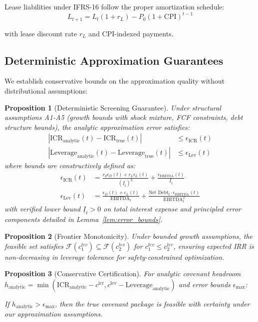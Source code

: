 \documentclass[11pt,a4paper]{article}
\newtheorem{proposition}{Proposition}
\begin{document}
Lease liabilities under IFRS-16 follow the proper amortization schedule:
\begin{equation}
L_{t+1} = L_t(1 + r_L) - P_0(1 + \text{CPI})^{t-1}
\end{equation}

with lease discount rate $r_L$ and CPI-indexed payments.

\subsection{Deterministic Approximation Guarantees}

We establish conservative bounds on the approximation quality without distributional assumptions:

\begin{proposition}[Deterministic Screening Guarantee]
Under structural assumptions A1-A5 (growth bounds with shock mixture, FCF constraints, debt structure bounds), the analytic approximation error satisfies:
\begin{align}
|\text{ICR}_{\text{analytic}}(t) - \text{ICR}_{\text{true}}(t)| &\leq \epsilon_{\text{ICR}}(t) \\
|\text{Leverage}_{\text{analytic}}(t) - \text{Leverage}_{\text{true}}(t)| &\leq \epsilon_{\text{Lev}}(t)
\end{align}
where bounds are constructively defined as:
\begin{align}
\epsilon_{\text{ICR}}(t) &= \frac{r_d \epsilon_D(t) + r_L \epsilon_L(t)}{(\underline{I}_t)^2} + \frac{\epsilon_{\text{EBITDA}}(t)}{\underline{I}_t} \\
\epsilon_{\text{Lev}}(t) &= \frac{\epsilon_D(t) + \epsilon_L(t)}{\text{EBITDA}_t} + \frac{\text{Net Debt}_t \cdot \epsilon_{\text{EBITDA}}(t)}{\text{EBITDA}_t^2}
\end{align}
with verified lower bound $\underline{I}_t > 0$ on total interest expense and principled error components detailed in Lemma~\ref{lem:error_bounds}.
\end{proposition}

\begin{proposition}[Frontier Monotonicity]
Under bounded growth assumptions, the feasible set satisfies $\mathcal{F}(c^{lev}_1) \subseteq \mathcal{F}(c^{lev}_2)$ for $c^{lev}_1 \leq c^{lev}_2$, ensuring expected IRR is non-decreasing in leverage tolerance for safety-constrained optimization.
\end{proposition}

\begin{proposition}[Conservative Certification]
For analytic covenant headroom $h_{\text{analytic}} = \min(\text{ICR}_{\text{analytic}} - c^{\text{icr}}, c^{\text{lev}} - \text{Leverage}_{\text{analytic}})$ and error bounds $\epsilon_{\max}$:

If $h_{\text{analytic}} > \epsilon_{\max}$, then the true covenant package is feasible with certainty under our approximation assumptions.
\end{proposition}
\end{document}
